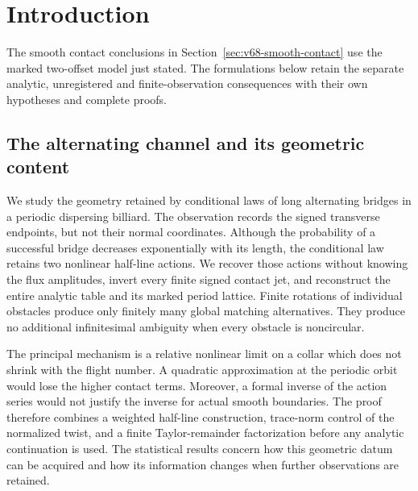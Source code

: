 \section{Introduction}
\label{sec:v48-introduction}



The smooth contact conclusions in Section~\ref{sec:v68-smooth-contact}
use the marked two-offset model just stated.  The formulations below
retain the separate analytic, unregistered and finite-observation
consequences with their own hypotheses and complete proofs.




\subsection{The alternating channel and its geometric content}

We study the geometry retained by conditional laws of long alternating
bridges in a periodic dispersing billiard.  The observation records the
signed transverse endpoints, but not their normal coordinates.  Although
the probability of a successful bridge decreases exponentially with its
length, the conditional law retains two nonlinear half-line actions.
We recover those actions without knowing the flux amplitudes, invert every
finite signed contact jet, and reconstruct the entire analytic table and
its marked period lattice.  Finite rotations of individual obstacles
produce only finitely many global matching alternatives.  They produce
no additional infinitesimal ambiguity when every obstacle is noncircular.

The principal mechanism is a relative nonlinear limit on a collar which
does not shrink with the flight number.  A quadratic approximation at the
periodic orbit would lose the higher contact terms.  Moreover, a formal
inverse of the action series would not justify the inverse for actual
smooth boundaries.  The proof therefore combines a weighted half-line
construction, trace-norm control of the normalized twist, and a finite
Taylor-remainder factorization before any analytic continuation is used.
The statistical results concern how this geometric datum can be acquired
and how its information changes when further observations are retained.



